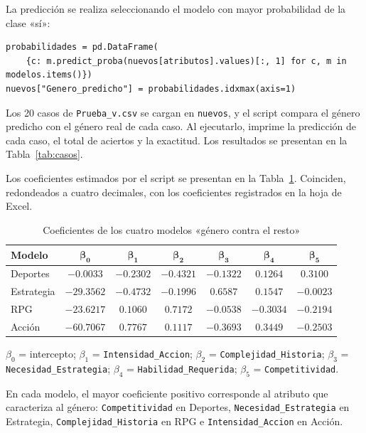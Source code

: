 \documentclass[]{article}
\begin{document}
La predicción se realiza seleccionando el modelo con mayor probabilidad de la clase «sí»:

\begin{lstlisting}
probabilidades = pd.DataFrame(
    {c: m.predict_proba(nuevos[atributos].values)[:, 1] for c, m in modelos.items()})
nuevos["Genero_predicho"] = probabilidades.idxmax(axis=1)
\end{lstlisting}

Los 20 casos de \texttt{Prueba\_v.csv} se cargan en \texttt{nuevos}, y el script compara el género predicho con el género real de cada caso. Al ejecutarlo, imprime la predicción de cada caso, el total de aciertos y la exactitud. Los resultados se presentan en la Tabla~\ref{tab:casos}.

Los coeficientes estimados por el script se presentan en la Tabla~\ref{tab:coeficientes}. Coinciden, redondeados a cuatro decimales, con los coeficientes registrados en la hoja de Excel.

\begin{table}[H]
\centering
\small
\caption{Coeficientes de los cuatro modelos «género contra el resto»}
\label{tab:coeficientes}
\begin{tabular}{l c c c c c c}
\toprule
\textbf{Modelo} & $\boldsymbol{\beta_0}$ & $\boldsymbol{\beta_1}$ & $\boldsymbol{\beta_2}$ & $\boldsymbol{\beta_3}$ & $\boldsymbol{\beta_4}$ & $\boldsymbol{\beta_5}$ \\
\midrule
Deportes   & $-0.0033$  & $-0.2302$ & $-0.4321$ & $-0.1322$ & $0.1264$  & $0.3100$ \\
Estrategia & $-29.3562$ & $-0.4732$ & $-0.1996$ & $0.6587$  & $0.1547$  & $-0.0023$ \\
RPG        & $-23.6217$ & $0.1060$  & $0.7172$  & $-0.0538$ & $-0.3034$ & $-0.2194$ \\
Acción     & $-60.7067$ & $0.7767$  & $0.1117$  & $-0.3693$ & $0.3449$  & $-0.2503$ \\
\bottomrule
\end{tabular}

\vspace{2pt}
{\footnotesize $\beta_0$ = intercepto; $\beta_1$ = \texttt{Intensidad\_Accion}; $\beta_2$ = \texttt{Complejidad\_Historia}; $\beta_3$ = \texttt{Necesidad\_Estrategia}; $\beta_4$ = \texttt{Habilidad\_Requerida}; $\beta_5$ = \texttt{Competitividad}.}
\end{table}

En cada modelo, el mayor coeficiente positivo corresponde al atributo que caracteriza al género: \texttt{Competitividad} en Deportes, \texttt{Necesidad\_Estrategia} en Estrategia, \texttt{Complejidad\_Historia} en RPG e \texttt{Intensidad\_Accion} en Acción.
\end{document}
